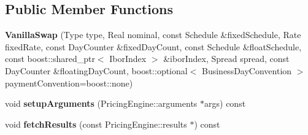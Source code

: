 \subsection*{Public Member Functions}
\begin{DoxyCompactItemize}
\item 
{\bfseries Vanilla\+Swap} (Type type, Real nominal, const Schedule \&fixed\+Schedule, Rate fixed\+Rate, const Day\+Counter \&fixed\+Day\+Count, const Schedule \&float\+Schedule, const boost\+::shared\+\_\+ptr$<$ Ibor\+Index $>$ \&ibor\+Index, Spread spread, const Day\+Counter \&floating\+Day\+Count, boost\+::optional$<$ Business\+Day\+Convention $>$ payment\+Convention=boost\+::none)\label{class_quant_lib_1_1_vanilla_swap_aa9dcd378ce885366fa5a221393b488a4}

\item 
void {\bfseries setup\+Arguments} (Pricing\+Engine\+::arguments $\ast$args) const \label{class_quant_lib_1_1_vanilla_swap_a78f5ae5687216917ec3ba2658aba2591}

\item 
void {\bfseries fetch\+Results} (const Pricing\+Engine\+::results $\ast$) const \label{class_quant_lib_1_1_vanilla_swap_a02c5df5ebbfefb90b1bd115a1d188ed1}

\end{DoxyCompactItemize}
